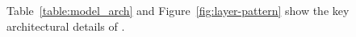 


Table~\ref{table:model_arch} and Figure~\ref{fig:layer-pattern} show the key architectural details of \ourmodel.
